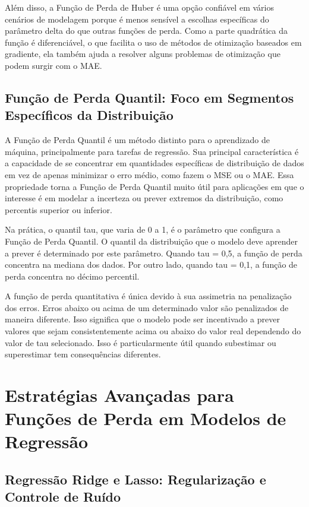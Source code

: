 \documentclass{article}
\begin{document}
Além disso, a Função de Perda de Huber é uma opção confiável em vários cenários de modelagem porque é menos sensível a escolhas específicas do parâmetro delta do que outras funções de perda. Como a parte quadrática da função é diferenciável, o que facilita o uso de métodos de otimização baseados em gradiente, ela também ajuda a resolver alguns problemas de otimização que podem surgir com o MAE.

\subsection{Função de Perda Quantil: Foco em Segmentos Específicos da Distribuição}

A Função de Perda Quantil é um método distinto para o aprendizado de máquina, principalmente para tarefas de regressão. Sua principal característica é a capacidade de se concentrar em quantidades específicas de distribuição de dados em vez de apenas minimizar o erro médio, como fazem o MSE ou o MAE. Essa propriedade torna a Função de Perda Quantil muito útil para aplicações em que o interesse é em modelar a incerteza ou prever extremos da distribuição, como percentis superior ou inferior.

Na prática, o quantil tau, que varia de 0 a 1, é o parâmetro que configura a Função de Perda Quantil. O quantil da distribuição que o modelo deve aprender a prever é determinado por este parâmetro. Quando tau = 0,5, a função de perda concentra na mediana dos dados. Por outro lado, quando tau = 0,1, a função de perda concentra no décimo percentil.

A função de perda quantitativa é única devido à sua assimetria na penalização dos erros. Erros abaixo ou acima de um determinado valor são penalizados de maneira diferente. Isso significa que o modelo pode ser incentivado a prever valores que sejam consistentemente acima ou abaixo do valor real dependendo do valor de tau selecionado. Isso é particularmente útil quando subestimar ou superestimar tem consequências diferentes.

\section{Estratégias Avançadas para Funções de Perda em Modelos de Regressão}

\subsection{Regressão Ridge e Lasso: Regularização e Controle de Ruído}
\end{document}
